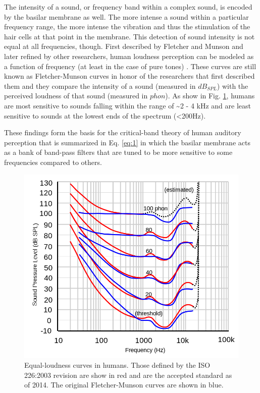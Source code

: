 \documentclass[titlepage]{article}
\begin{document}
    The intensity of a sound, or frequency band within a complex sound, is encoded
    by the basilar membrane as well. The more intense a sound within a particular
    frequency range, the more intense the vibration and thus the stimulation of the
    hair cells at that point in the membrane. This detection of sound intensity
    is not equal at all frequencies, though. First described by Fletcher and Munson
    and later refined by other researchers, human loudness perception can be modeled
    as a function of frequency (at least in the case of pure tones) \cite{Fastl2007,Fletcher1933,Kandel2000}.
    These curves are still known as Fletcher-Munson curves in honor of the researchers
    that first described them and they compare the intensity of a sound (measured in $dB_{SPL}$)
    with the perceived loudness of that sound (measured in $phon$). As show in Fig. \ref{fletcherMunsonCurve},
    humans are most sensitive to sounds falling within the range of \textasciitilde 2 - 4 kHz and
    are least sensitive to sounds at the lowest ends of the spectrum (\textless 200Hz).

    These findings form the basis for the critical-band theory of human auditory
    perception that is summarized in Eq. \ref{eq:1} in which the basilar membrane
    acts as a bank of band-pass filters that are tuned to be more sensitive
    to some frequencies compared to others.


    \begin{figure}
      \centering
      \includegraphics[scale=0.3]{fletcherMunsonCurveWithUnits}
      \caption{Equal-loudness curves in humans. Those defined by the ISO 226:2003 revision
      are show in red and are the accepted standard as of 2014.
      The original Fletcher-Munson curves are shown in blue.}
      \label{fletcherMunsonCurve}
    \end{figure}
\end{document}
